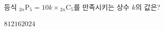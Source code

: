 \hspace*{2mm}\begin{minipage}[t]{\dimexpr\linewidth-2mm\relax}\vspace{0pt}
등식 ${}_{2n}\mathrm{P}_5=10k\times{}_{2n}\mathrm{C}_5$를 만족시키는 상수 $k$의 값은? 
\begin{choices32}{$8$}{$12$}{$16$}{$20$}{$24$}\end{choices32}\end{minipage}
